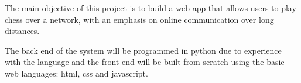 The main objective of this project is to build a web app that allows users to play chess over a network, with an emphasis on online communication over long distances.

The back end of the system will be programmed in python due to experience with the language and the front end will be built from scratch using the basic web languages: html, css and javascript.